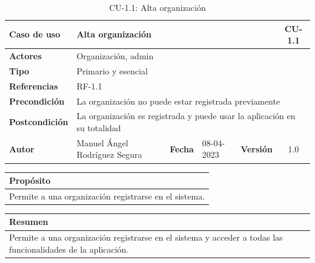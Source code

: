 \begin{table}[H]
    \begin{center}
        \begin{adjustbox}{width=\textwidth}
            \begin{tabular}{ | l | l | l | l | c | c | }
                \hline
                \textbf{Caso de uso} & \multicolumn{4}{l|}{Alta organización} & \cellcolor{gray!50} \textbf{CU-1.1}\\
                \hline
                \textbf{Actores} & \multicolumn{5}{p{0.5\linewidth}|}{Organización, admin} \\
                \hline
                \textbf{Tipo} & \multicolumn{5}{l|}{Primario y esencial} \\
                \hline
                \textbf{Referencias} & \multicolumn{3}{l|}{RF-1.1} & \multicolumn{2}{l|}{ }\\
                \hline
                \textbf{Precondición} & \multicolumn{5}{l|}{La organización no puede estar registrada previamente} \\
                \hline
                \textbf{Postcondición} & \multicolumn{5}{l|}{La organización es registrada y puede usar la aplicación en su totalidad} \\
                \hline
                \textbf{Autor} & \multicolumn{1}{p{0.25\linewidth}|}{Manuel Ángel Rodríguez Segura} & \textbf{Fecha} &
                08-04-2023     & \textbf{Versión}                                                      & 1.0\\
                \hline
            \end{tabular}
        \end{adjustbox}
        \caption{CU-1.1: Alta organización}
        \label{tab:alta-organizacion}
    \end{center}
\end{table}

\begin{table}[H]
    \centering
    \begin{tabularx}{\textwidth}{@{} |L |@{}} \hline
        \textbf{Propósito} \\
        \hline
        Permite a una organización registrarse en el sistema. \\
        \hline
    \end{tabularx}
\end{table}

\begin{table}[H]
    \centering
    \begin{tabularx}{\textwidth}{@{} |L |@{}} \hline
        \textbf{Resumen} \\
        \hline
        Permite a una organización registrarse en el sistema y acceder a todas las funcionalidades de la aplicación. \\
        \hline
    \end{tabularx}
\end{table}

